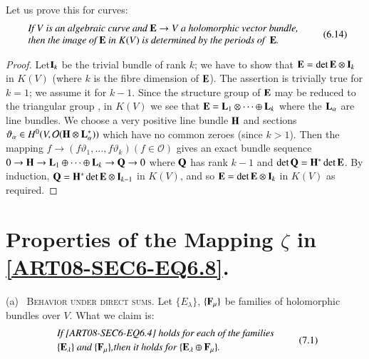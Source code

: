 Let us prove this for curves:
\begin{equation*}
\begin{array}{l}
\text{\em If $V$ is an algebraic curve and $\mathbf{E}\to V$ a holomorphic vector bundle,}\\
\text{\em then the image of $\mathbf{E}$ in $K(V)$ is determined by the periods of~ $\mathbf{E}$.}
\end{array}\tag{6.14}\label{art08-sec6-eq6.14}
\end{equation*}

\begin{proof}
Let\pageoriginale $\mathbf{I}_{k}$ be the trivial bundle of rank $k$; we have to show that $\mathbf{E}=\det \mathbf{E}\otimes \mathbf{I}_{k}$ in $K(V)$ (where $k$ is the fibre dimension of $\mathbf{E}$). The assertion is trivially true for $k=1$; we assume it for $k-1$. Since the structure group of $\mathbf{E}$ may be reduced to the triangular group \cite{art08-key2}, in $K(V)$ we see that $\mathbf{E}=\mathbf{L}_{1}\otimes\cdots\oplus \mathbf{L}_{k}$ where the $\mathbf{L}_{\alpha}$ are line bundles. We choose a very positive line bundle $\mathbf{H}$ and sections $\vartheta_{\alpha}\in H^{0}(V,\mathcal{O}(\mathbf{H}\otimes \mathbf{L}^{*}_{\alpha}))$ which have no common zeroes (since $k>1$). Then the mapping $f\to (f\vartheta_{1},\ldots,f\vartheta_{k})(f\in \mathcal{O})$ gives an exact bundle sequence $0\to \mathbf{H}\to \mathbf{L}_{1}\oplus\cdots\oplus \mathbf{L}_{k}\to \mathbf{Q}\to 0$ where $\mathbf{Q}$ has rank $k-1$ and $\det \mathbf{Q}=\mathbf{H}^{*}\det \mathbf{E}$. By induction, $\mathbf{Q}=\mathbf{H}^{*}\det \mathbf{E}\otimes \mathbf{I}_{k-1}$ in $K(V)$, and so $\mathbf{E}=\det \mathbf{E}\otimes \mathbf{I}_{k}$ in $K(V)$ as required.
\end{proof}

\section{Properties of the Mapping \texorpdfstring{$\zeta$}{zeta} in \texorpdfstring{\eqref{ART08-SEC6-EQ6.8}}{eq6.8}.}\label{art08-sec7}

(a)~ \textsc{Behavior under direct sums.} Let $\{E_{\lambda}\}$, $\{\mathbf{F}_{\mu}\}$ be families of holomorphic bundles over $V$. What we claim is:
\begin{equation*}
\begin{array}{l}
\text{\em If \eqref{ART08-SEC6-EQ6.4} holds for each of the families}\\[2pt]
\text{\em $\{\mathbf{E}_{\lambda}\}$ and $\{\mathbf{F}_{\mu}\}$,then it holds for $\{\mathbf{E}_{\lambda}\oplus \mathbf{F}_{\mu}\}$.}
\end{array}\tag{7.1}\label{art08-sec7-eq7.1}
\end{equation*}

